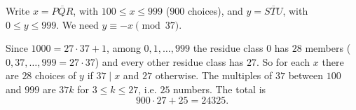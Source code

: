 Write $x=\overline{PQR}$, with $100\le x\le999$ ($900$ choices), and $y=\overline{STU}$, with $0\le y\le999$. We need $y\equiv-x\pmod{37}$.

Since $1000=27\cdot37+1$, among $0,1,\ldots,999$ the residue class $0$ has $28$ members ($0,37,\ldots,999=27\cdot37$) and every other residue class has $27$. So for each $x$ there are $28$ choices of $y$ if $37\mid x$ and $27$ otherwise. The multiples of $37$ between $100$ and $999$ are $37k$ for $3\le k\le27$, i.e. $25$ numbers. The total is
\[900\cdot27+25=\boxed{24325}.\]

